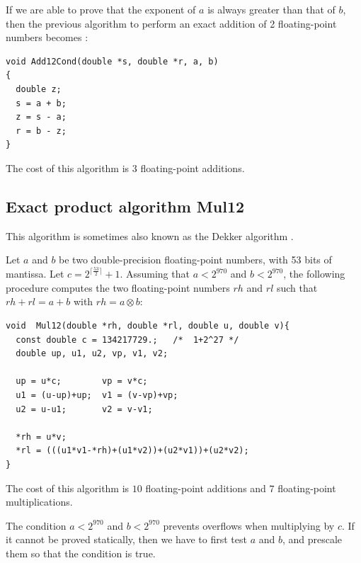 If we are able to prove that  the exponent of $a$ is always greater than that
of $b$, then the previous algorithm to perform an exact addition of 2
floating-point numbers becomes :
\begin{lstlisting}[label={lst:Add12},caption={Add12},firstnumber=1]
void Add12Cond(double *s, double *r, a, b) 
{
  double z;
  s = a + b;            
  z = s - a;  
  r = b - z; 
}            
\end{lstlisting}
The cost of this algorithm is $3$ floating-point additions.






\subsection{Exact product algorithm {Mul12}}

This algorithm is sometimes  also known as the Dekker algorithm \cite{Dek71,Knu73}.

\begin{theorem}
  Let $a$ and $b$ be two double-precision floating-point numbers, with
  53 bits of mantissa. Let $c=2^{\lceil\frac{ 53}{2} \rceil}+1$.
  Assuming that $a<2^{970}$ and $b<2^{970}$, the following procedure
  computes the two floating-point numbers $rh$ and $rl$ such that $rh
  + rl = a + b$ with $rh = a \otimes b$:
\begin{lstlisting}[label={lst:Mul12},caption={Mul12},firstnumber=1]
void  Mul12(double *rh, double *rl, double u, double v){
  const double c = 134217729.;   /*  1+2^27 */ 
  double up, u1, u2, vp, v1, v2;

  up = u*c;        vp = v*c;
  u1 = (u-up)+up;  v1 = (v-vp)+vp;
  u2 = u-u1;       v2 = v-v1;
  
  *rh = u*v;
  *rl = (((u1*v1-*rh)+(u1*v2))+(u2*v1))+(u2*v2);
}
\end{lstlisting}
\end{theorem}

The cost of this algorithm is $10$ floating-point
additions and $7$ floating-point multiplications.



The condition $a<2^{970}$ and $b<2^{970}$ prevents overflows when
multiplying by $c$. If it cannot be proved statically, then we have to
first test $a$ and $b$, and prescale them so that the condition is
true.


